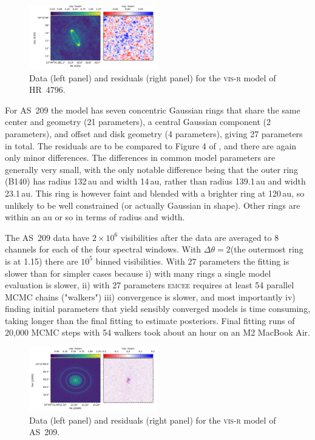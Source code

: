 \documentclass[fleqn,usenatbib]{mnras}
\begin{document}
\begin{figure}
    \centering
    \hspace{-0.5cm}\includegraphics[width=0.5\textwidth]{doc/resid_hr4796.pdf}
    \caption{Data (left panel) and residuals (right panel) for the \textsc{vis-r} model of HR~4796.}
    \label{fig:hr4796resid}
\end{figure}

For AS~209 the model has seven concentric Gaussian rings that share the same center and geometry (21 parameters), a central Gaussian component (2 parameters), and offset and disk geometry (4 parameters), giving 27 parameters in total. The residuals are to be compared to Figure 4 of \citet{2018ApJ...869L..48G}, and there are again only minor differences. The differences in common model parameters are generally very small, with the only notable difference being that the outer ring (B140) has radius 132\,au and width 14\,au, rather than radius 139.1\,au and width 23.1\,au. This ring is however faint and blended with a brighter ring at 120\,au, so unlikely to be well constrained (or actually Gaussian in shape). Other rings are within an au or so in terms of radius and width.

The AS~209 data have $2 \times 10^6$ visibilities after the data are averaged to 8 channels for each of the four spectral windows. With $\Delta \theta = 2$\arcsec (the outermost ring is at 1.15\arcsec) there are $10^5$ binned visibilities. With 27 parameters the fitting is slower than for simpler cases because i) with many rings a single model evaluation is slower, ii) with 27 parameters \textsc{emcee} requires at least 54 parallel MCMC chains ("walkers") iii) convergence is slower, and most importantly iv) finding initial parameters that yield sensibly converged models is time consuming, taking longer than the final fitting to estimate posteriors. Final fitting runs of 20,000 MCMC steps with 54 walkers took about an hour on an M2 MacBook Air.

\begin{figure}
    \centering
    \hspace{-0.5cm}\includegraphics[width=0.5\textwidth]{doc/resid_as209.pdf}
    \caption{Data (left panel) and residuals (right panel) for the \textsc{vis-r} model of AS~209.}
    \label{fig:as209resid}
\end{figure}
\end{document}
